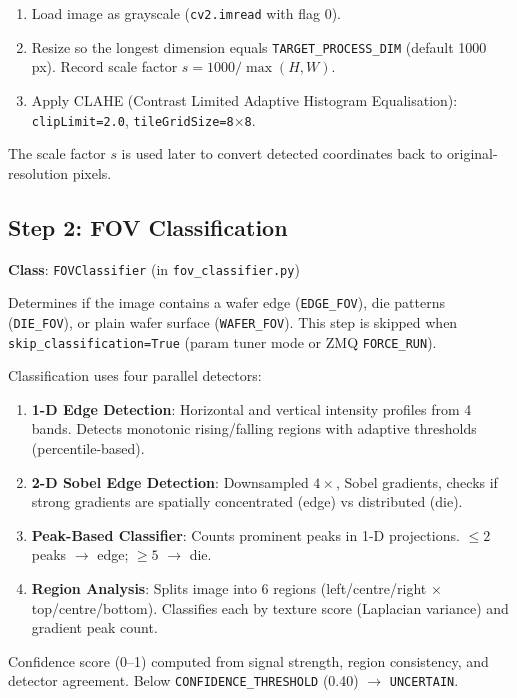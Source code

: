 \documentclass[11pt,a4paper]{article}
\begin{document}
\begin{enumerate}
\item Load image as grayscale (\texttt{cv2.imread} with flag 0).
\item Resize so the longest dimension equals \texttt{TARGET\_PROCESS\_DIM} (default 1000\,px). Record scale factor $s = 1000 / \max(H,W)$.
\item Apply CLAHE (Contrast Limited Adaptive Histogram Equalisation): \texttt{clipLimit=2.0}, \texttt{tileGridSize=8$\times$8}.
\end{enumerate}

The scale factor $s$ is used later to convert detected coordinates back to original-resolution pixels.

\subsection{Step 2: FOV Classification}
\textbf{Class}: \texttt{FOVClassifier} (in \texttt{fov\_classifier.py})

Determines if the image contains a wafer edge (\texttt{EDGE\_FOV}), die patterns (\texttt{DIE\_FOV}), or plain wafer surface (\texttt{WAFER\_FOV}). This step is skipped when \texttt{skip\_classification=True} (param tuner mode or ZMQ \texttt{FORCE\_RUN}).

Classification uses four parallel detectors:
\begin{enumerate}
\item \textbf{1-D Edge Detection}: Horizontal and vertical intensity profiles from 4 bands. Detects monotonic rising/falling regions with adaptive thresholds (percentile-based).
\item \textbf{2-D Sobel Edge Detection}: Downsampled $4\times$, Sobel gradients, checks if strong gradients are spatially concentrated (edge) vs distributed (die).
\item \textbf{Peak-Based Classifier}: Counts prominent peaks in 1-D projections. $\leq 2$ peaks $\rightarrow$ edge; $\geq 5$ $\rightarrow$ die.
\item \textbf{Region Analysis}: Splits image into 6 regions (left/centre/right $\times$ top/centre/bottom). Classifies each by texture score (Laplacian variance) and gradient peak count.
\end{enumerate}

Confidence score (0--1) computed from signal strength, region consistency, and detector agreement. Below \texttt{CONFIDENCE\_THRESHOLD} (0.40) $\rightarrow$ \texttt{UNCERTAIN}.
\end{document}

